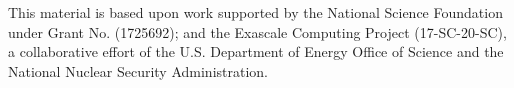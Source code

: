 \documentclass[sigconf]{acmart}
\begin{document}
%
\begin{acks}
This material is based upon work supported by the National Science Foundation under Grant No. (1725692); and the Exascale Computing Project (17-SC-20-SC), a collaborative effort of the
U.S. Department of Energy Office of Science and the National Nuclear Security Administration.
\end{acks}

%


\end{document}
